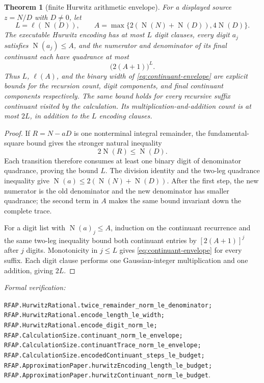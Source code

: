 \documentclass[11pt]{article}
\newtheorem{theorem}{Theorem}[section]
\newcommand{\Norm}[1]{\operatorname{N}\!\left(#1\right)}
\newcommand{\leanref}[1]{\par\smallskip\noindent
  \emph{Formal verification:}\par\nobreak
  {\raggedright\nolinkurl{#1}.\par}}
\begin{document}
\begin{theorem}[finite Hurwitz arithmetic envelope]
\label{thm:hurwitz-arithmetic-envelope}
For a displayed source $z=N/D$ with $D\ne0$, let
\[
 L=\ell(\Norm D),\qquad
 A=\max\{2(\Norm N+\Norm D),4\Norm D\}.
\]
The executable Hurwitz encoding has at most $L$ digit clauses, every digit
$a_j$ satisfies $\Norm{a_j}\le A$, and the numerator and denominator of its
final continuant each have quadrance at most
\begin{equation}
\label{eq:continuant-envelope}
                         \bigl(2(A+1)\bigr)^L.
\end{equation}
Thus $L$, $\ell(A)$, and the binary width of
\eqref{eq:continuant-envelope} are explicit bounds for the recursion count,
digit components, and final continuant components respectively.
The same bound holds for every recursive suffix continuant visited by the
calculation.  Its multiplication-and-addition count is at most $2L$, in
addition to the $L$ encoding clauses.
\end{theorem}

\begin{proof}
If $R=N-aD$ is one nonterminal integral remainder, the fundamental-square
bound gives the stronger natural inequality
\[
                         2\Norm R\le\Norm D.
\]
Each transition therefore consumes at least one binary digit of denominator
quadrance, proving the bound $L$.  The division identity and the two-leg
quadrance inequality give
$\Norm a\le2(\Norm N+\Norm D)$.  After the first step, the new numerator is
the old denominator and the new denominator has smaller quadrance; the second
term in $A$ makes the same bound invariant down the complete trace.

For a digit list with $\Norm a_j\le A$, induction on the continuant recurrence
and the same two-leg inequality bound both continuant entries by
$[2(A+1)]^j$ after $j$ digits.  Monotonicity in $j\le L$ gives
\eqref{eq:continuant-envelope} for every suffix.  Each digit clause performs
one Gaussian-integer multiplication and one addition, giving $2L$.
\end{proof}

\leanref{RFAP.HurwitzRational.twice_remainder_norm_le_denominator;
RFAP.HurwitzRational.encode_length_le_width;
RFAP.HurwitzRational.encode_digit_norm_le;
RFAP.CalculationSize.continuant_norm_le_envelope;
RFAP.CalculationSize.continuantTrace_norm_le_envelope;
RFAP.CalculationSize.encodedContinuant_steps_le_budget;
RFAP.ApproximationPaper.hurwitzEncoding_length_le_budget;
RFAP.ApproximationPaper.hurwitzContinuant_norm_le_budget}
\end{document}
